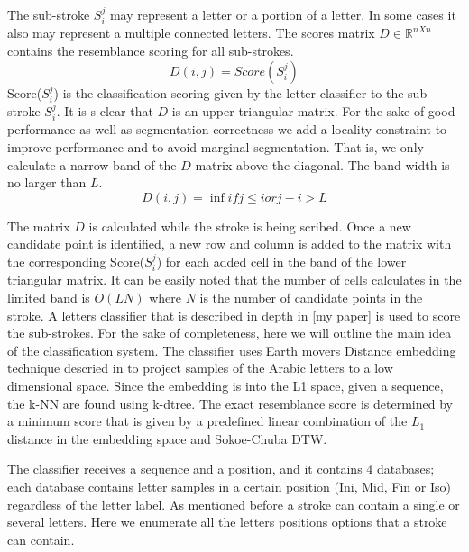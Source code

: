 \documentclass[12pt,journal,compsoc]{IEEEtran}
\begin{document}
The sub-stroke  $S_{i}^{j}$ may represent a letter or a portion of a letter. In some cases it also may represent a multiple connected letters. The scores matrix $D\in\mathbb{R}^{nXn}$ contains the resemblance scoring for all sub-strokes. 
\begin{equation}
D(i,j)=Score(S_{i}^{j})
\end{equation}
Score($S_{i}^{j}$) is the classification scoring given by the letter classifier to the sub-stroke $S_{i}^{j}$. It is s clear that $D$ is an upper triangular matrix. For the sake of good performance as well as segmentation correctness we add a locality constraint to improve performance and to avoid marginal segmentation. That is, we only calculate a narrow band of the $D$ matrix above the diagonal. The band width is no larger than $L$.
\begin{equation}
D(i,j)=\inf if j \leq i or j-i>L 
\end{equation}

The matrix $D$ is calculated while the stroke is being scribed. Once a new candidate point is identified, a new row and column is added to the matrix with the corresponding Score($S_{i}^{j}$) for each added cell in the band of the lower triangular matrix. It can be easily noted that the number of cells calculates in the limited band is $O(LN)$ where $N$ is the number of candidate points in the stroke. 
A letters classifier that is described in depth in [my paper] is used to score the sub-strokes. For the sake of completeness, here we will outline the main idea of the classification system. The classifier uses Earth movers Distance embedding technique descried in \cite{shirdhonkar2008approximate} to project samples of the Arabic letters to a low dimensional space. Since the embedding is into the L1 space, given a sequence, the k-NN are found using k-dtree. The exact resemblance score is determined by a minimum score that is given by a predefined linear combination of the $L_{1}$ distance in the embedding space and Sokoe-Chuba DTW.

The classifier receives a sequence and a position, and it contains 4 databases; each database contains letter samples in a certain position (Ini, Mid, Fin or Iso) regardless of the letter label. As mentioned before a stroke can contain a single or several letters. Here we enumerate all the letters positions options that a stroke can contain.  
\end{document}
